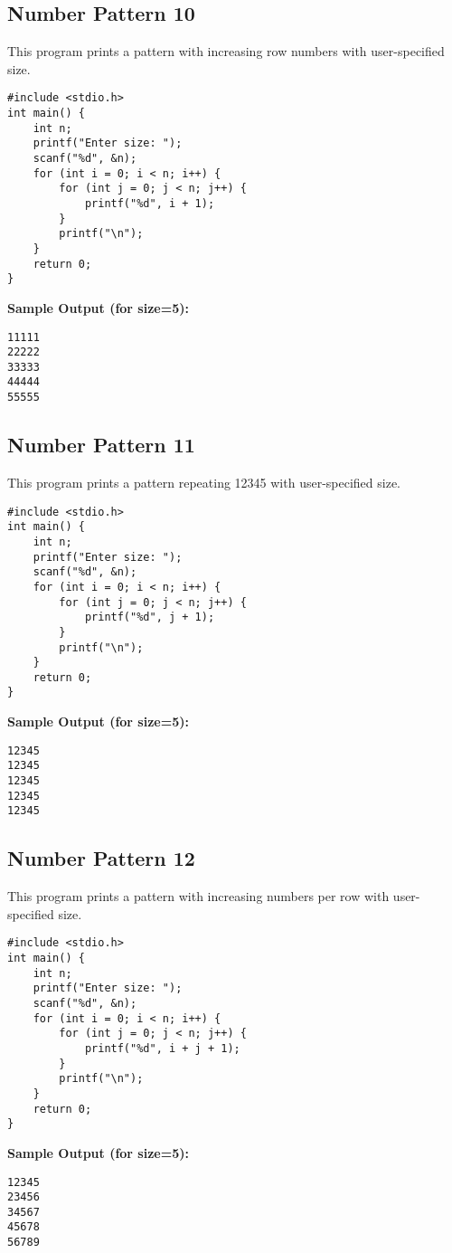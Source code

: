 \documentclass[a4paper,12pt]{article}
\begin{document}
\subsection{Number Pattern 10}
This program prints a pattern with increasing row numbers with user-specified size.
\begin{lstlisting}[caption={Number Pattern 10}]
#include <stdio.h>
int main() {
    int n;
    printf("Enter size: ");
    scanf("%d", &n);
    for (int i = 0; i < n; i++) {
        for (int j = 0; j < n; j++) {
            printf("%d", i + 1);
        }
        printf("\n");
    }
    return 0;
}
\end{lstlisting}
\textbf{Sample Output (for size=5):}
\begin{verbatim}
11111
22222
33333
44444
55555
\end{verbatim}
\clearpage

\subsection{Number Pattern 11}
This program prints a pattern repeating 12345 with user-specified size.
\begin{lstlisting}[caption={Number Pattern 11}]
#include <stdio.h>
int main() {
    int n;
    printf("Enter size: ");
    scanf("%d", &n);
    for (int i = 0; i < n; i++) {
        for (int j = 0; j < n; j++) {
            printf("%d", j + 1);
        }
        printf("\n");
    }
    return 0;
}
\end{lstlisting}
\textbf{Sample Output (for size=5):}
\begin{verbatim}
12345
12345
12345
12345
12345
\end{verbatim}
\clearpage

\subsection{Number Pattern 12}
This program prints a pattern with increasing numbers per row with user-specified size.
\begin{lstlisting}[caption={Number Pattern 12}]
#include <stdio.h>
int main() {
    int n;
    printf("Enter size: ");
    scanf("%d", &n);
    for (int i = 0; i < n; i++) {
        for (int j = 0; j < n; j++) {
            printf("%d", i + j + 1);
        }
        printf("\n");
    }
    return 0;
}
\end{lstlisting}
\textbf{Sample Output (for size=5):}
\begin{verbatim}
12345
23456
34567
45678
56789
\end{verbatim}
\clearpage
\end{document}
